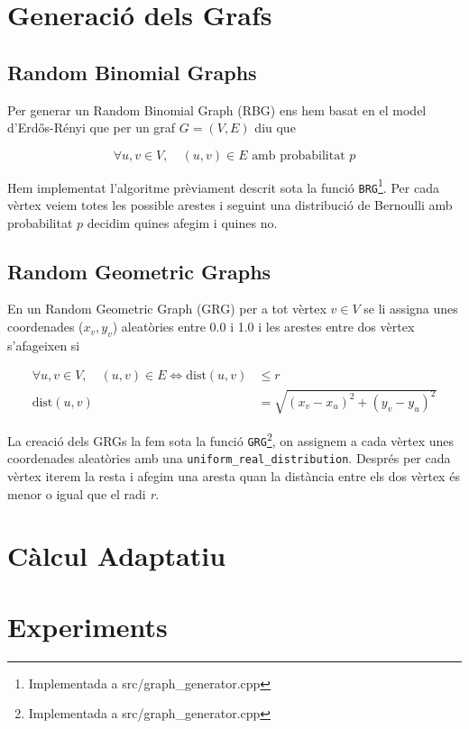 \section{Generació dels Grafs}
\subsection{Random Binomial Graphs}
Per generar un Random Binomial Graph (RBG) ens hem basat en el model d'Erdős-Rényi \cite{Erdos1960OnGraphs,Erdos1959OnI} que per un graf $G=(V,E)$ diu que

\begin{equation}
    \forall u,v \in V,\quad (u,v) \in E \text{ amb probabilitat } p
\end{equation}

Hem implementat l'algoritme prèviament descrit sota la funció \texttt{BRG}\footnote{Implementada a src/graph\_generator.cpp}. Per cada vèrtex veiem totes les possible arestes i seguint una distribució de Bernoulli amb probabilitat $p$ decidim quines afegim i quines no.

\subsection{Random Geometric Graphs}
En un Random Geometric Graph (GRG)\cite{Diaz2007On} per a tot vèrtex $v \in V$ se li assigna unes coordenades ($x_v, y_v$) aleatòries entre 0.0 i 1.0 i les arestes entre dos vèrtex s'afageixen si

\begin{align}
    \forall u,v \in V,\quad (u,v) \in E \Longleftrightarrow \text{dist}(u,v) &\leq r \\
    \text{dist}(u,v) &= \sqrt{\left(x_v - x_u\right)^2 + \left(y_v - y_u\right)^2}
\end{align}

La creació dels GRGs la fem sota la funció \texttt{GRG}\footnote{Implementada a src/graph\_generator.cpp}, on assignem a cada vèrtex unes coordenades aleatòries amb una \texttt{uniform\_real\_distribution}. Després per cada vèrtex iterem la resta i afegim una aresta quan la distància entre els dos vèrtex és menor o igual que el radi \textit{r}.

\section{Càlcul Adaptatiu}

\section{Experiments}


